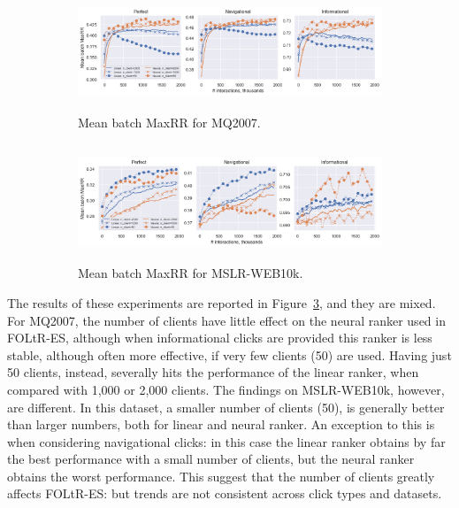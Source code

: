 \begin{figure}[t]
	\centering
	\begin{subfigure}{1\textwidth}
		\includegraphics[width=13cm, height=3.5cm]{images/RQ2/mq2007_foltr_client_both_p0.9.png}
		\caption{Mean batch MaxRR for MQ2007.}
		\label{fig:mq2007-rq2}
	\end{subfigure}
	\begin{subfigure}{1\textwidth}
		\includegraphics[width=13cm, height=3.5cm]{images/RQ2/mslr10k_foltr_client_both_p0.9.png}
		\caption{Mean batch MaxRR for MSLR-WEB10k.}
		\label{fig:mslr10k-rq2}
	\end{subfigure}
	\caption{{\color{red}{Results for RQ2: performance of FOLtR-ES with respect to number of clients (averaged across all dataset splits).}} \label{fig:RQ2}} 
\end{figure}

The results of these experiments are reported in Figure~\ref{fig:RQ2}, and they are mixed. For MQ2007, the number of clients have little effect on the neural ranker used in FOLtR-ES, although when informational clicks are provided this ranker is less stable, although often more effective, if very few clients (50) are used. Having just 50 clients, instead, severally hits the performance of the linear ranker, when compared with 1,000 or 2,000 clients. The findings on MSLR-WEB10k, however, are different. In this dataset, a smaller number of clients (50), is generally better than larger numbers, both for linear and neural ranker. An exception to this is when considering navigational clicks: in this case the linear ranker obtains by far the best performance with a small number of clients, but the neural ranker obtains the worst performance. This suggest that the number of clients greatly affects FOLtR-ES: but trends are not consistent across click types and datasets. 


